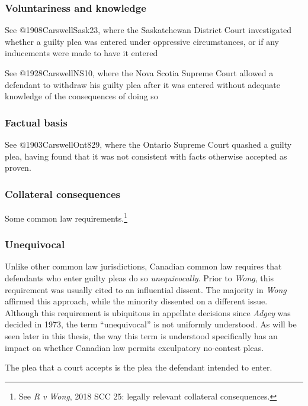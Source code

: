 \subsubsection{Voluntariness and knowledge}

See @1908CarswellSask23, where the Saskatchewan District Court investigated whether a guilty plea was entered under oppressive circumstances, or if any inducements were made to have it entered

See @1928CarswellNS10, where the Nova Scotia Supreme Court allowed a defendant to withdraw his guilty plea after it was entered without adequate knowledge of the consequences of doing so

\subsubsection{Factual basis}

See @1903CarswellOnt829, where the Ontario Supreme Court quashed a guilty plea, having found that it was not consistent with facts otherwise accepted as proven.

\subsubsection{Collateral consequences}



Some common law requirements.\footnote{See \textit{R v Wong}, 2018 SCC 25: legally relevant collateral consequences.}

\subsubsection{Unequivocal}

Unlike other common law jurisdictions, Canadian common law requires that defendants who enter guilty pleas do so \textit{unequivocally}. Prior to \textit{Wong}, this requirement was usually cited to an influential dissent. The majority in \textit{Wong} affirmed this approach, while the minority dissented on a different issue. Although this requirement is ubiquitous in appellate decisions since \textit{Adgey} was decided in 1973, the term ``unequivocal'' is not uniformly understood. As will be seen later in this thesis, the way this term is understood specifically has an impact on whether Canadian law permits exculpatory no-contest pleas.

The plea that a court accepts is the plea the defendant intended to enter.


